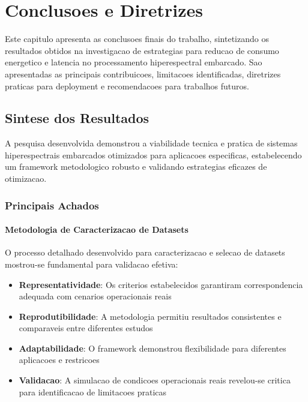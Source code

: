 \chapter{Conclusoes e Diretrizes}\label{chp:conclusoes}

Este capitulo apresenta as conclusoes finais do trabalho, sintetizando os resultados obtidos na investigacao de estrategias para reducao de consumo energetico e latencia no processamento hiperespectral embarcado. Sao apresentadas as principais contribuicoes, limitacoes identificadas, diretrizes praticas para deployment e recomendacoes para trabalhos futuros.

\section{Sintese dos Resultados}\label{sec:sintese}

A pesquisa desenvolvida demonstrou a viabilidade tecnica e pratica de sistemas hiperespectrais embarcados otimizados para aplicacoes especificas, estabelecendo um framework metodologico robusto e validando estrategias eficazes de otimizacao.

\subsection{Principais Achados}

\subsubsection{Metodologia de Caracterizacao de Datasets}
O processo detalhado desenvolvido para caracterizacao e selecao de datasets mostrou-se fundamental para validacao efetiva:

\begin{itemize}
    \item \textbf{Representatividade}: Os criterios estabelecidos garantiram correspondencia adequada com cenarios operacionais reais
    \item \textbf{Reprodutibilidade}: A metodologia permitiu resultados consistentes e comparaveis entre diferentes estudos
    \item \textbf{Adaptabilidade}: O framework demonstrou flexibilidade para diferentes aplicacoes e restricoes
    \item \textbf{Validacao}: A simulacao de condicoes operacionais reais revelou-se critica para identificacao de limitacoes praticas
\end{itemize}

